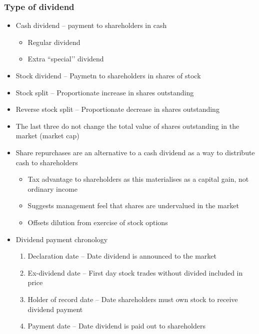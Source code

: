 \documentclass[../notes_compiled.tex]{subfiles}
\begin{document}
\subsubsection{Type of dividend}
\begin{itemize}
\item Cash dividend -- payment to shareholders in cash
\begin{itemize}
\item Regular dividend
\item Extra ``special’’ dividend
\end{itemize}
\item Stock dividend -- Paymetn to shareholders in shares of stock
\item Stock split -- Proportionate increase in shares outstanding
\item Reverse stock split -- Proportionate decrease in shares outstanding
\item[] The last three do not change the total value of shares outstanding in the market (market cap)

\item Share repurchases are an alternative to a cash dividend as a way to distribute cash to shareholders
\begin{itemize}
\item Tax advantage to shareholders as this materialises as a capital gain, not ordinary income
\item Suggests management feel that shares are undervalued in the market
\item Offsets dilution from exercise of stock options
\end{itemize}
\item Dividend payment chronology
\begin{enumerate}
\item Declaration date -- Date dividend is announced to the market
\item Ex-dividend date -- First day stock trades without divided included in price
\item Holder of record date -- Date shareholders must own stock to receive dividend payment
\item Payment date -- Date dividend is paid out to shareholders
\end{enumerate}
\end{itemize}
\end{document}
